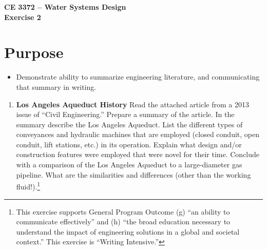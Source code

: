 \documentclass[12pt]{article}
\begin{document}
\begin{center}
{\textbf{{ CE 3372 -- Water Systems Design} \\ {Exercise 2}}}
\end{center}
\section*{\small{Purpose}}
\begin{itemize}
\item Demonstrate ability to summarize engineering literature, and communicating that summary in writing.
\end{itemize}
\begin{enumerate}

\item{\textbf{Los Angeles Aqueduct History}}
Read the attached article from a 2013 issue of ``Civil Engineering.''   Prepare a summary of the article.   In the summary describe the Los Angeles Aqueduct.  List the different types of conveyances and hydraulic machines that are employed (closed conduit, open conduit, lift stations, etc.) in its operation.  Explain what design and/or construction features were employed that were novel for their time.  Conclude with a comparison of the Los Angeles Aqueduct to a large-diameter gas pipeline.  What are the similarities and differences (other than the working fluid!).\footnote{This exercise supports General Program Outcome (g) ``an ability to communicate effectively'' and (h) ``the broad education necessary to understand the impact of engineering solutions in a global and societal context.''   This exercise is ``Writing Intensive.''}
\end{enumerate}

\end{document}
